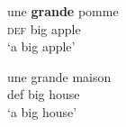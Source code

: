 

\gll une \textbf{grande} pomme\\
     \textsc{def} big apple\\
\glt `a big apple'

\gll une grande maison\\
     def big house\\
\glt `a big house'


